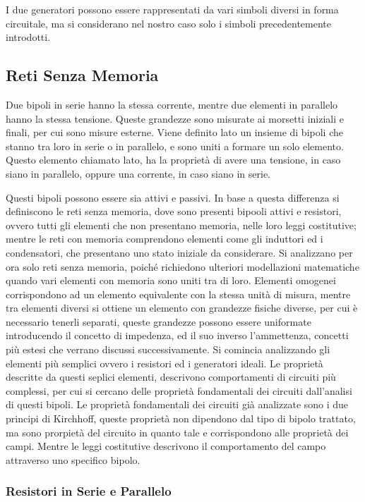 \documentclass{article}
\numberwithin{equation}{subsection}
\begin{document}
I due generatori possono essere rappresentati da vari simboli diversi in forma circuitale, ma si considerano nel nostro caso solo i simboli precedentemente introdotti.  

\subsection{Reti Senza Memoria}

Due bipoli in serie hanno la stessa corrente, mentre due elementi in parallelo hanno la stessa tensione. Queste grandezze sono misurate ai morsetti iniziali e finali, per cui 
sono misure esterne. 
Viene definito lato un insieme di bipoli che stanno tra loro in serie o in parallelo, e sono uniti a formare un solo elemento. Questo elemento chiamato lato, ha la proprietà di avere 
una tensione, in caso siano in parallelo, oppure una corrente, in caso siano in serie. 

Questi bipoli possono essere sia attivi e passivi. In base a questa differenza si definiscono le reti senza memoria, dove sono presenti bipooli attivi e resistori, ovvero tutti 
gli elementi che non presentano memoria, nelle loro leggi costitutive; mentre le reti con memoria comprendono elementi come gli induttori ed i condensatori, che presentano 
uno stato iniziale da considerare. Si analizzano per ora solo reti senza memoria, poiché richiedono ulteriori modellazioni matematiche 
quando vari elementi con memoria sono uniti tra di loro. Elementi omogenei corrispondono ad un elemento equivalente con la stessa unità di misura, mentre tra elementi diversi 
si ottiene un elemento con grandezze fisiche diverse, per cui è necessario tenerli separati, queste grandezze possono essere uniformate introducendo il concetto di impedenza, 
ed il suo inverso l'ammettenza, concetti più estesi che verrano discussi successivamente. Si comincia analizzando gli elementi più semplici ovvero i resistori ed i generatori 
ideali. Le proprietà descritte da questi seplici elementi, descrivono comportamenti di circuiti più complessi, per cui si cercano delle proprietà fondamentali dei circuiti 
dall'analisi di questi bipoli. Le proprietà fondamentali dei circuiti già analizzate sono i due principi di Kirchhoff, queste proprietà non dipendono dal tipo di bipolo trattato, 
ma sono prorpietà del circuito in quanto tale e corrispondono alle proprietà dei campi. Mentre le leggi costitutive descrivono il comportamento del campo attraverso uno 
specifico bipolo.   

\subsubsection{Resistori in Serie e Parallelo}
\end{document}
